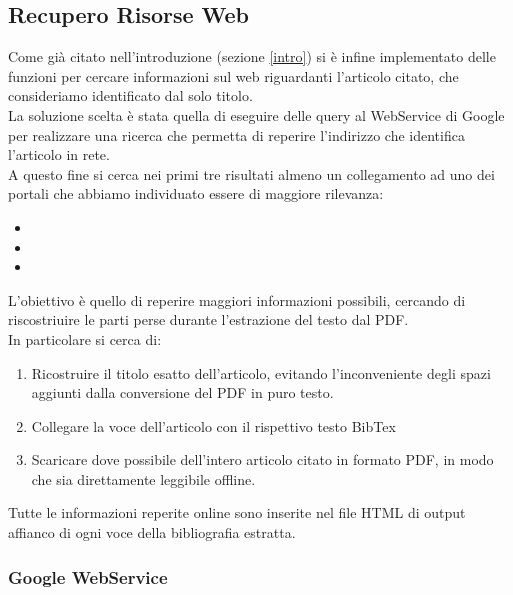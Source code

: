 \subsection{Recupero Risorse Web}

Come già citato nell'introduzione (sezione \ref{intro}) si è infine implementato delle funzioni per cercare informazioni sul web riguardanti l'articolo citato, che consideriamo identificato dal solo titolo.
\\
La soluzione scelta è stata quella di eseguire delle query al WebService di Google per realizzare una ricerca che permetta di reperire l'indirizzo che identifica l'articolo in rete.
\\ 
A questo fine si cerca nei primi tre risultati almeno un collegamento ad uno dei portali che abbiamo individuato essere di maggiore rilevanza:

\begin{itemize} 
\item {}
\item {}
\item {}
\end{itemize}

L'obiettivo è quello di reperire maggiori informazioni possibili, cercando di riscostriuire le parti perse durante l'estrazione del testo dal PDF.
\\
In particolare si cerca di:

\begin{enumerate}
	\item Ricostruire il titolo esatto dell'articolo, evitando l'inconveniente degli spazi aggiunti dalla conversione del PDF in puro testo.
	\item Collegare la voce dell'articolo con il rispettivo testo BibTex
	\item Scaricare dove possibile dell'intero articolo citato in formato PDF, in modo che sia direttamente leggibile offline.
\end{enumerate}

Tutte le informazioni reperite online sono inserite nel file HTML di output affianco di ogni voce della bibliografia estratta.
\\

\subsubsection{Google WebService}

